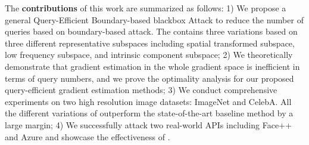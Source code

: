 The \textbf{contributions} of this work are summarized as follows: 
1) We propose a general Query-Efficient Boundary-based blackbox Attack \name to reduce the number of queries based on boundary-based attack. The \name contains three variations based on three different representative subspaces including spatial transformed subspace, low frequency subspace, and intrinsic component subspace;
2) We theoretically demonstrate that gradient estimation in the whole gradient space is inefficient in terms of query numbers, and we prove the optimality analysis for our proposed query-efficient gradient estimation methods;
3) We conduct comprehensive experiments on two high resolution image datasets: ImageNet and CelebA. All the different variations of \name outperform the state-of-the-art baseline method by a large margin;
4) We successfully attack two real-world APIs including Face++\cite{facepp-compare-api} and Azure\cite{azure-detect-api} and showcase the effectiveness of \name.



